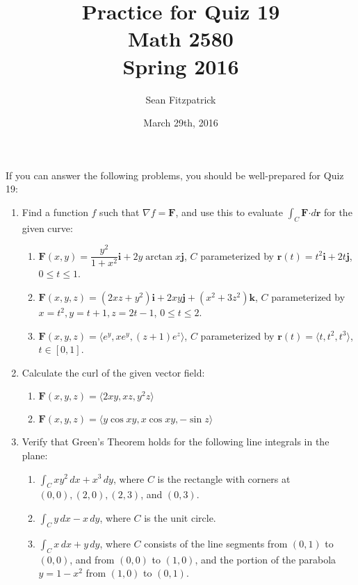 \documentclass[letterpaper,12pt]{article}
\title{Practice for Quiz 19\\Math 2580\\Spring 2016}
\author{Sean Fitzpatrick}
\date{March 29th, 2016}
\renewcommand{\i}{\mathbf{i}}
\renewcommand{\j}{\mathbf{j}}
\renewcommand{\k}{\mathbf{k}}
\renewcommand{\r}{\mathbf{r}}
\newcommand{\dotp}{\boldsymbol{\cdot}}
\newcommand{\F}{\mathbf{F}}
\begin{document}
 \maketitle

If you can answer the following problems, you should be well-prepared for Quiz 19:



\begin{enumerate}
 \item Find a function $f$ such that $\nabla f = \F$, and use this to evaluate $\int_C \F\dotp d\r$ for the given curve:
\begin{enumerate}
 \item $\F(x,y) = \dfrac{y^2}{1+x^2}\i + 2y\arctan x\j$, $C$ parameterized by $\r(t) = t^2\i+2t\j$, $0\leq t\leq 1$.
 \item $\F(x,y,z) = (2xz+y^2)\i+2xy\j + (x^2+3z^2)\k$, $C$ parameterized by $x=t^2, y=t+1, z=2t-1$, $0\leq t\leq 2$.
 \item $\F(x,y,z) = \langle e^y, xe^y, (z+1)e^z\rangle$, $C$ parameterized by $\r(t) = \langle t, t^2, t^3\rangle$, $t\in [0,1]$.
\end{enumerate}
 \item Calculate the curl of the given vector field:
\begin{enumerate}
 \item $\F(x,y,z) = \langle 2xy, xz, y^2z\rangle$
 \item $\F(x,y,z) = \langle y\cos xy, x\cos xy, -\sin z\rangle$
\end{enumerate}
 \item Verify that Green's Theorem holds for the following line integrals in the plane:
\begin{enumerate}
 \item $\int_C xy^2\,dx+x^3\,dy$, where $C$ is the rectangle with corners at $(0,0), (2,0), (2,3)$, and $(0,3)$.
 \item $\int_C y\,dx-x\,dy$, where $C$ is the unit circle.
 \item $\int_C x\,dx+y\,dy$, where $C$ consists of the line segments from $(0,1)$ to $(0,0)$, and from $(0,0)$ to $(1,0)$, and the portion of the parabola $y=1-x^2$ from $(1,0)$ to $(0,1)$.
\end{enumerate}

\end{enumerate}
\end{document}
